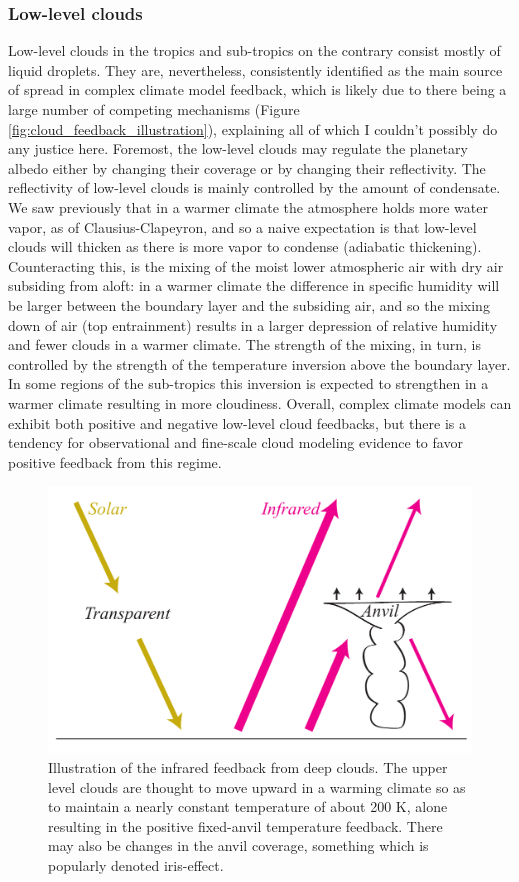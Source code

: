 \documentclass[12pt]{book}
\begin{document}
\subsubsection{Low-level clouds}
Low-level clouds in the tropics and sub-tropics on the contrary consist mostly of liquid droplets. They are, nevertheless, consistently identified as the main source of spread in complex climate model feedback, which is likely due to there being a large number of competing mechanisms (Figure \ref{fig:cloud_feedback_illustration}), explaining all of which I couldn't possibly do any justice here. Foremost, the low-level clouds may regulate the planetary albedo either by changing their coverage or by changing their reflectivity. The reflectivity of low-level clouds is mainly controlled by the amount of condensate. We saw previously that in a warmer climate the atmosphere holds more water vapor, as of Clausius-Clapeyron, and so a naive expectation is that low-level clouds will thicken as there is more vapor to condense (adiabatic thickening). Counteracting this, is the mixing of the moist lower atmospheric air with dry air subsiding from aloft: in a warmer climate the difference in specific humidity will be larger between the boundary layer and the subsiding air, and so the mixing down of air (top entrainment) results in a larger depression of relative humidity and fewer clouds in a warmer climate. The strength of the mixing, in turn, is controlled by the strength of the temperature inversion above the boundary layer. In some regions of the sub-tropics this inversion is expected to strengthen in a warmer climate resulting in more cloudiness. Overall, complex climate models can exhibit both positive and negative low-level cloud feedbacks, but there is a tendency for observational and fine-scale cloud modeling evidence to favor positive feedback from this regime.

\begin{figure}
\begin{center}
\includegraphics[width=10 cm]{../illustrations/Deep_cloud_feedback_illustration.pdf}
\end{center}
\caption{ Illustration of the infrared feedback from deep clouds. The upper level clouds are thought to move upward in a warming climate so as to maintain a nearly constant temperature of about 200 K, alone resulting in the positive fixed-anvil temperature feedback. There may also be changes in the anvil coverage, something which is popularly denoted iris-effect. } 
\label{fig:deep_cloud_feedback_illustration}
\end{figure}
\end{document}
